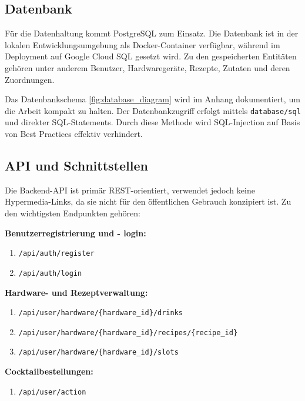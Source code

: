 \subsection{Datenbank}

Für die Datenhaltung kommt PostgreSQL zum Einsatz. Die Datenbank ist in der lokalen 
Entwicklungsumgebung als Docker-Container verfügbar, während im Deployment auf Google Cloud SQL 
gesetzt wird. Zu den gespeicherten Entitäten gehören unter anderem Benutzer, Hardwaregeräte, 
Rezepte, Zutaten und deren Zuordnungen.

Das Datenbankschema \ref{fig:database_diagram} wird im Anhang dokumentiert, um die Arbeit kompakt zu 
halten. Der Datenbankzugriff erfolgt mittels \texttt{database/sql} und direkter SQL-Statements. 
Durch diese Methode wird SQL-Injection auf Basis von Best Practices effektiv verhindert.

\subsection{API und 
Schnittstellen}

Die Backend-API ist primär REST-orientiert, verwendet jedoch keine Hypermedia-Links, da sie nicht 
für den öffentlichen Gebrauch konzipiert ist. Zu den wichtigsten Endpunkten gehören:

\vspace{0.5cm}
\textbf{Benutzerregistrierung und - login:}
\begin{enumerate}
  \item \texttt{/api/auth/register}
  \item \texttt{/api/auth/login}
\end{enumerate}

\vspace{0.5cm}
\textbf{Hardware- und Rezeptverwaltung:}
\begin{enumerate}
	\item \texttt{/api/user/hardware/\{hardware\_id\}/drinks}
	\item \texttt{/api/user/hardware/\{hardware\_id\}/recipes/\{recipe\_id\}}
	\item \texttt{/api/user/hardware/\{hardware\_id\}/slots}
\end{enumerate}

\vspace{0.5cm}
\textbf{Cocktailbestellungen:}
\begin{enumerate}
  \item \texttt{/api/user/action}
\end{enumerate}

